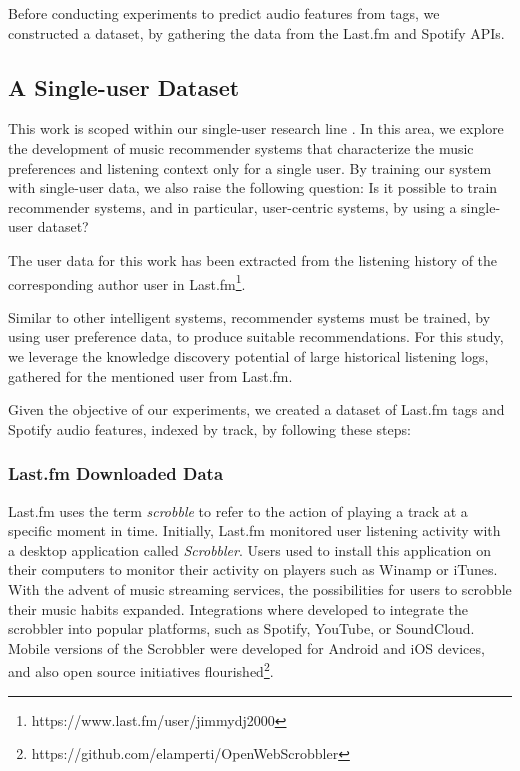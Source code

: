 \documentclass[sn-mathphys]{sn-jnl}%
\theoremstyle{thmstyleone}%
\theoremstyle{thmstyletwo}%
\theoremstyle{thmstylethree}%
\begin{document}


Before conducting experiments to predict audio features from tags,
we constructed a dataset, by gathering the data from the Last.fm and Spotify APIs.

\subsection{A Single-user Dataset}

This work is scoped within our single-user research line \cite{ramirez2022user}.
In this area, we explore the development of music recommender systems that
characterize the music preferences and listening context only for a single user.
By training our system with single-user data, we also raise the following question: Is it possible to train
recommender systems, and in particular, user-centric systems, by using a single-user dataset?

The user data for this work has been extracted from the
listening history of the corresponding author user in Last.fm\footnote[5]{https://www.last.fm/user/jimmydj2000}.


Similar to other intelligent systems, recommender systems
must be trained, by using user preference data, to produce
suitable recommendations. For this study,
we leverage the knowledge discovery potential
of large historical listening logs, gathered for the mentioned user from Last.fm.

Given the objective of our experiments,
we created a dataset of Last.fm tags and Spotify audio features, indexed by track, by following these steps:


\subsubsection{Last.fm Downloaded Data}

Last.fm uses the term \emph{scrobble} to refer to the action of playing a track at a specific moment in time.
Initially, Last.fm monitored user listening activity with a desktop application called \emph{Scrobbler}.
Users used to install this application on their computers to monitor their activity on players such as Winamp or iTunes.
With the advent of music streaming services, the possibilities for users to scrobble their music habits expanded.
Integrations where developed to integrate the scrobbler into popular platforms,
such as Spotify, YouTube, or SoundCloud.
Mobile versions of the Scrobbler were developed for Android and iOS devices, and also open source initiatives flourished\footnote[6]{https://github.com/elamperti/OpenWebScrobbler}.
\end{document}
